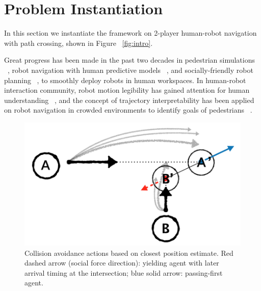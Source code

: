 \documentclass[letterpaper, 10 pt, conference]{ieeeconf}  %
\begin{document}
\section{Problem Instantiation}
In this section we instantiate the framework on 2-player human-robot navigation with path 
crossing, shown in Figure ~\ref{fig:intro}.


Great progress has been made in the past two decades in pedestrian simulations ~\cite{karamouzas2009predictive,zanlungo2011social}, robot navigation with human predictive models ~\cite{trautman2010unfreezing,kuderer2012feature}, and socially-friendly robot planning ~\cite{mavrogiannis2016decentralized,chen2017socially}, to smoothly deploy robots in human workspaces. In human-robot interaction community, robot motion legibility has gained attention for human understanding ~\cite{dragan2013legibility}, and the concept of trajectory interpretability has been applied on robot navigation in crowded environments to identify goals of pedestrians ~\cite{bai2015intention,unhelkar2015human}. 

   \begin{figure}[t]
      \centering
      \vspace{-1em}
      \includegraphics[scale=0.27]{pedestrian_avoidance}
      \vspace{-1em}
      \caption{Collision avoidance actions based on closest position estimate. 
      Red dashed arrow (social force direction): yielding agent with later 
      arrival timing at the intersection; blue solid arrow: passing-first agent. }
      \vspace{-1.5em}
     \label{fig:legibility}
   \end{figure}
\end{document}
